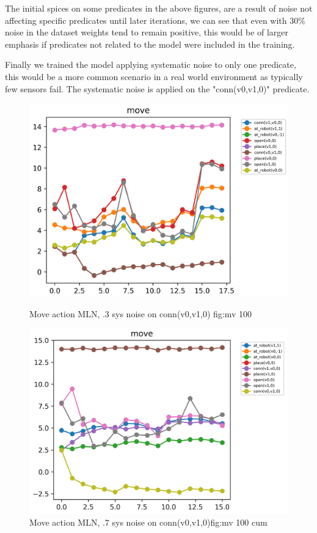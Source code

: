 The initial spices on some predicates in the above figures, are a result of noise not affecting specific predicates until later iterations, we can see that even with 30\% noise in the dataset weights tend to remain positive, this would be of larger emphasis if predicates not related to the model were included in the training.

Finally we trained the model applying systematic noise to only one predicate, this would be a more common scenario in a real world environment as typically few sensors fail.
The systematic noise is applied on the "conn(v0,v1,0)" predicate.
\begin{figure}[h]
 \centering
 \begin{minipage}[b]{0.49\linewidth}
 \includegraphics[width=1\textwidth]{images/tests/movegraph_sys_70}
 \caption{Move action MLN, .3 sys noise on conn(v0,v1,0) {fig:mv 100}}

 \end{minipage}
 \hfill
 \begin{minipage}[b]{0.49\linewidth}

 \includegraphics[width=1\textwidth]{images/tests/movegraph_sys_30}
 \caption{Move action MLN, .7 sys noise on conn(v0,v1,0){fig:mv 100 cum}}

 \end{minipage}
\end{figure}

